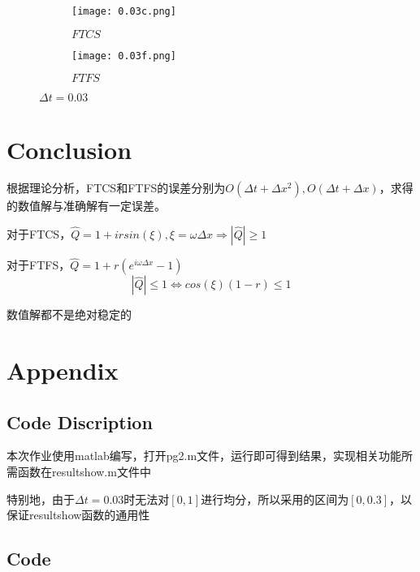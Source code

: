 \documentclass{article}
\begin{document}
\begin{figure}[H]
    \centering
    \begin{subfigure}[b]{0.47\textwidth}
        \centering
        \texttt{[image: 0.03c.png]}
        \caption{$FTCS$}
        
    \end{subfigure}
    \begin{subfigure}[b]{0.47\textwidth}
        \centering
        \texttt{[image: 0.03f.png]}
        \caption{$FTFS$}
        
    \end{subfigure}
    \caption{$\Delta t=0.03$}
\end{figure}
\section{Conclusion}
根据理论分析，FTCS和FTFS的误差分别为$O(\Delta t+\Delta x^2),O(\Delta t+\Delta x)$，求得的数值解与准确解有一定误差。

对于FTCS，$\hat{Q}=1+irsin(\xi),\xi=\omega \Delta x\Rightarrow |\hat{Q}|\geq 1$

对于FTFS，$\hat{Q}=1+r(e^{i\omega \Delta x}-1)$
$$|\hat{Q}|\leq 1\Leftrightarrow cos(\xi)(1-r)\leq 1$$

数值解都不是绝对稳定的

\section{Appendix}
\subsection{Code Discription}

本次作业使用matlab编写，打开pg2.m文件，运行即可得到结果，实现相关功能所需函数在resultshow.m文件中

特别地，由于$\Delta t=0.03$时无法对$[0,1]$进行均分，所以采用的区间为$[0,0.3]$，以保证resultshow函数的通用性

\subsection{Code}


\end{document}
